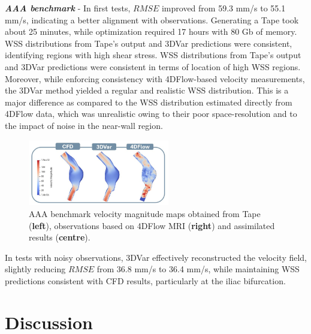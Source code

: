 \textbf{\textit{AAA benchmark}} - In first tests, \(RMSE\) improved from 59.3 mm/s to 55.1 mm/s, indicating a better alignment with observations. Generating a Tape took about 25 minutes, while optimization required 17 hours with 80 Gb of memory. WSS distributions from Tape's output and 3DVar predictions were consistent, identifying regions with high shear stress. WSS distributions from Tape's output and 3DVar predictions were consistent in terms of location of high WSS regions. Moreover, while enforcing consistency with 4DFlow-based velocity measurements, the 3DVar method yielded a regular and realistic WSS distribution. This is a major difference as compared to the WSS distribution estimated directly from 4DFlow data, which was unrealistic owing to their poor space-resolution and to the impact of noise in the near-wall region.

\begin{figure}
    \centering
    \includegraphics[width=0.55\textwidth, height = 0.15\textheight]{chapters/chp1/graphics/RealData3DVar.JPG}
    \caption{\small AAA benchmark velocity magnitude maps obtained from Tape (\textbf{left}), observations based on 4DFlow MRI (\textbf{right}) and assimilated results (\textbf{centre}).}
    \label{fig:3.7}
\end{figure}

In tests with noisy observations, 3DVar effectively reconstructed the velocity field, slightly reducing \(RMSE\) from 36.8 mm/s to 36.4 mm/s, while maintaining WSS predictions consistent with CFD results, particularly at the iliac bifurcation.


\section*{Discussion}

